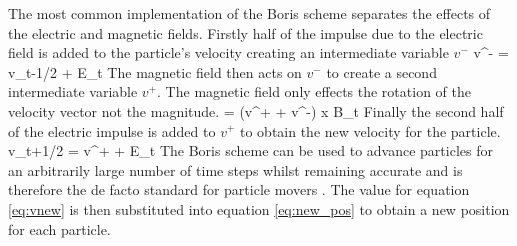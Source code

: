 The most common implementation of the Boris scheme separates the effects of the electric and magnetic fields.
Firstly half of the impulse due to the electric field is added to the particle's velocity creating an intermediate variable $v^-$
\be
v^- = v_{t-1/2} +  E_t 
\ee
The magnetic field then acts on $v^-$ to create a second intermediate variable $v^+$. The magnetic field only effects the rotation of the velocity vector not the magnitude.
\be 
{} =  (v^+ + v^-) x B_t
\ee
Finally the second half of the electric impulse is added to $v^+$ to obtain the new velocity for the particle.
\be 
v_{t+1/2} =  v^+ +  E_t 
\label{eq:vnew}
\ee
The Boris scheme can be used to advance particles for an arbitrarily large number of time steps whilst remaining accurate and is therefore the de facto standard for particle movers \cite{boris_good}. The value for equation \ref{eq:vnew} is then substituted into equation \ref{eq:new_pos} to obtain a new position for each particle.




%
%

